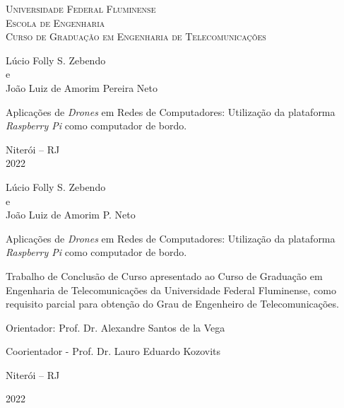 \documentclass[12pt,a4paper,oneside]{book}
\begin{document}
%


\begin{titlepage}
  \begin{center}
    \Large{\textsc{Universidade Federal Fluminense} \\
           \textsc{Escola de Engenharia} \\
           \textsc{Curso de Graduação em Engenharia de Telecomunicações} 
          }
    \par\vfill
    \LARGE{Lúcio Folly S. Zebendo\\e\\João Luiz de Amorim Pereira Neto}
    \par\vfill
    \LARGE{Aplica\c{c}\~{o}es de \textit{Drones} em Redes de Computadores: Utilização da plataforma \textit{Raspberry Pi} como computador de bordo.}
    \par\vfill
    \Large{Niterói -- RJ\\
    2022}
  \end{center}
\end{titlepage}




\begin{center}

Lúcio Folly S. Zebendo\\e\\João Luiz de Amorim P. Neto

\vfill

Aplica\c{c}\~{o}es de \textit{Drones} em Redes de Computadores: Utilização da plataforma \textit{Raspberry Pi} como computador de bordo.

\vspace{3.0cm}

\begin{flushright}
\begin{minipage}{0.55\textwidth}
%
Trabalho de Conclusão de Curso 
apresentado ao Curso de Graduação em Engenharia de Telecomunicações 
da Universidade Federal Fluminense, 
como requisito parcial para obtenção 
do Grau de Engenheiro de Telecomunicações. 
%
\end{minipage}
\end{flushright}

\vspace{3.0cm}

Orientador: Prof. Dr. Alexandre Santos de la Vega

Coorientador - Prof. Dr. Lauro Eduardo Kozovits
\vfill

Niterói -- RJ

2022

\end{center}
\end{document}
